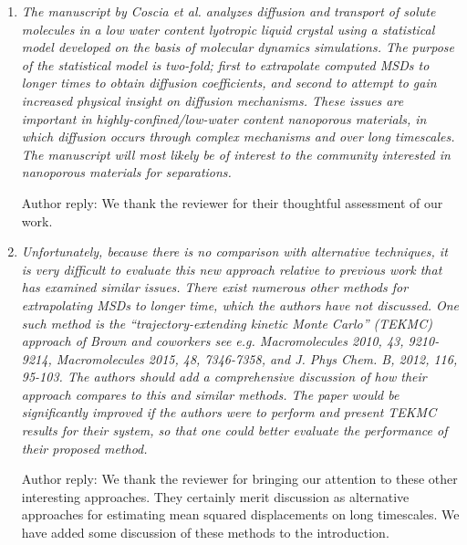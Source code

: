 \documentclass{article}
\begin{document}
\begin{enumerate}[label={Comment \theenumi :}, leftmargin=3.9\parindent]

    \item \textit{The manuscript by Coscia et al. analyzes diffusion and transport of solute molecules
    in a low water content lyotropic liquid crystal using a statistical model developed on the basis 
    of molecular dynamics simulations. The purpose of the statistical model is two-fold; first to 
    extrapolate computed MSDs to longer times to obtain diffusion coefficients, and second to attempt
    to gain increased physical insight on diffusion mechanisms. These issues are important in 
    highly-confined/low-water content nanoporous materials, in which diffusion occurs through complex
    mechanisms and over long timescales. The manuscript will most likely be of interest to the community
    interested in nanoporous materials for separations.}
    
    Author reply: We thank the reviewer for their thoughtful assessment of our work.
    
    \item \textit {Unfortunately, because there is no comparison with alternative techniques, it is 
    very difficult to evaluate this new approach relative to previous work that has examined similar 
    issues. There exist numerous other methods for extrapolating MSDs to longer time, which the 
    authors have not discussed. One such method is the “trajectory-extending kinetic Monte Carlo” 
    (TEKMC) approach of Brown and coworkers see e.g. Macromolecules 2010, 43, 9210-9214, 
    Macromolecules 2015, 48, 7346-7358, and J. Phys Chem. B, 2012, 116, 95-103. The authors should 
    add a comprehensive discussion of how their approach compares to this and similar methods. The 
    paper would be significantly improved if the authors were to perform and present TEKMC results 
    for their system, so that one could better evaluate the performance of their proposed method.}
    
    Author reply: We thank the reviewer for bringing our attention to these other interesting 
    approaches. They certainly merit discussion as alternative approaches for estimating mean 
    squared displacements on long timescales. We have added some discussion of these methods to 
    the introduction.
    

\end{enumerate}
\end{document}
